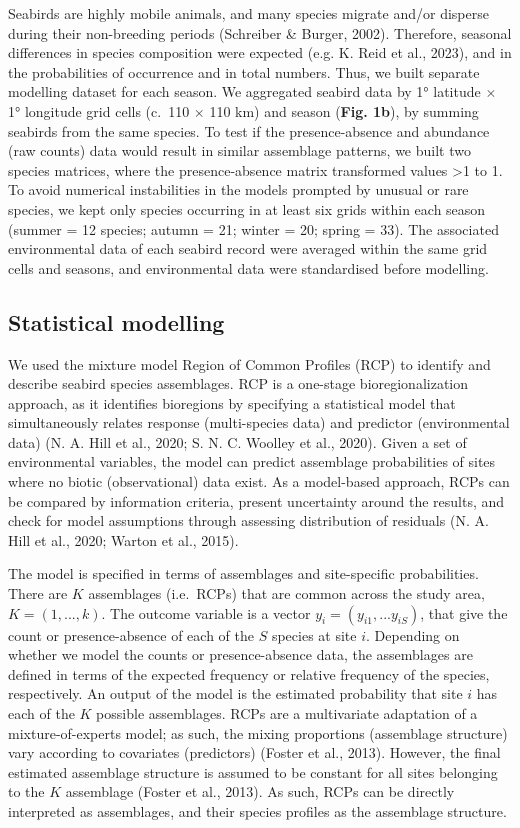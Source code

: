\documentclass{article}
\begin{document}
Seabirds are highly mobile animals, and many species migrate and/or
disperse during their non-breeding periods (Schreiber \& Burger, 2002).
Therefore, seasonal differences in species composition were expected
(e.g. K. Reid et al., 2023), and in the probabilities of occurrence and
in total numbers. Thus, we built separate modelling dataset for each
season. We aggregated seabird data by 1° latitude \(\times\) 1°
longitude grid cells (c.~110 \(\times\) 110 km) and season (\textbf{Fig.
1b}), by summing seabirds from the same species. To test if the
presence-absence and abundance (raw counts) data would result in similar
assemblage patterns, we built two species matrices, where the
presence-absence matrix transformed values \textgreater1 to 1. To avoid
numerical instabilities in the models prompted by unusual or rare
species, we kept only species occurring in at least six grids within
each season (summer = 12 species; autumn = 21; winter = 20; spring =
33). The associated environmental data of each seabird record were
averaged within the same grid cells and seasons, and environmental data
were standardised before modelling.

\hypertarget{statistical-modelling}{%
\subsection{Statistical modelling}\label{statistical-modelling}}

We used the mixture model Region of Common Profiles (RCP) to identify
and describe seabird species assemblages. RCP is a one-stage
bioregionalization approach, as it identifies bioregions by specifying a
statistical model that simultaneously relates response (multi-species
data) and predictor (environmental data) (N. A. Hill et al., 2020; S. N.
C. Woolley et al., 2020). Given a set of environmental variables, the
model can predict assemblage probabilities of sites where no biotic
(observational) data exist. As a model-based approach, RCPs can be
compared by information criteria, present uncertainty around the
results, and check for model assumptions through assessing distribution
of residuals (N. A. Hill et al., 2020; Warton et al., 2015).

The model is specified in terms of assemblages and site-specific
probabilities. There are \(K\) assemblages (i.e.~RCPs) that are common
across the study area, \(K = (1, ..., k)\). The outcome variable is a
vector \(y_{i} = (y_{i1}, ... y_{iS})\), that give the count or
presence-absence of each of the \(S\) species at site \(i\). Depending
on whether we model the counts or presence-absence data, the assemblages
are defined in terms of the expected frequency or relative frequency of
the species, respectively. An output of the model is the estimated
probability that site \(i\) has each of the \(K\) possible assemblages.
RCPs are a multivariate adaptation of a mixture-of-experts model; as
such, the mixing proportions (assemblage structure) vary according to
covariates (predictors) (Foster et al., 2013). However, the final
estimated assemblage structure is assumed to be constant for all sites
belonging to the \(K\) assemblage (Foster et al., 2013). As such, RCPs
can be directly interpreted as assemblages, and their species profiles
as the assemblage structure.
\end{document}
